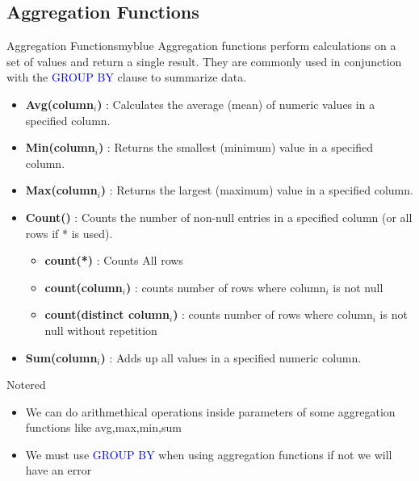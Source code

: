\subsection{Aggregation Functions}
 \begin{prettyBox}{Aggregation Functions}{myblue}
   Aggregation functions perform calculations on a set of values and return a single result. They are commonly used in conjunction with the \textcolor{blue}{GROUP BY} clause to summarize data.
   \begin{itemize}
    \item \textbf{Avg(column$_{i}$)} : Calculates the average (mean) of numeric values in a specified column.
    \item \textbf{Min(column$_{i}$)} : Returns the smallest (minimum) value in a specified column.
    \item \textbf{Max(column$_{i}$)} : Returns the largest (maximum) value in a specified column.
    \item \textbf{Count()} : Counts the number of non-null entries in a specified column (or all rows if * is used).
      \begin{itemize}
        \item  \textbf{count(*)} : Counts All rows
        \item  \textbf{count(column$_{i}$)} : counts number of rows where column$_{i}$ is not null
        \item  \textbf{count(distinct column$_{i}$)} : counts number of rows where column$_{i}$ is not null without repetition
    \end{itemize}
    \item \textbf{Sum(column$_{i}$)} : Adds up all values in a specified numeric column.
   \end{itemize} 
\end{prettyBox}

\vspace{0.25cm}

\begin{prettyBox}{Note}{red}
\begin{itemize}
    \item We can do arithmethical operations inside parameters of some aggregation functions like avg,max,min,sum 
    \item We must use \textcolor{blue}{GROUP BY} when using aggregation functions if not we will have an error
\end{itemize}
\end{prettyBox}

